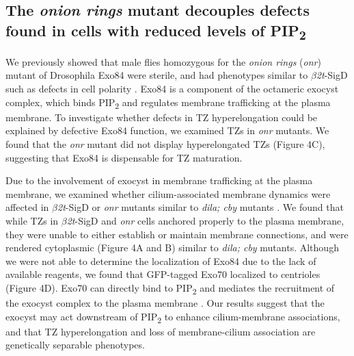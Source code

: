 \documentclass[12pt, twoside, letterpaper]{article}
\newcommand{\PIP}{PIP\textsubscript{2}}
\newcommand{\sigd}{$\beta$\textit{2t}-SigD}
\begin{document}
\begin{doublespacing}
\begin{linenumbers}
    \subsection{The \textit{onion rings} mutant decouples defects found in cells with reduced levels of \PIP{}}
    We previously showed that male flies homozygous for the \textit{onion rings}
    (\textit{onr}) mutant of Drosophila Exo84 were sterile, and had phenotypes
    similar to \sigd{} such as defects in cell polarity \citep{wei2008depletion}.
    Exo84 is a component of the octameric exocyst complex, which binds
    \PIP{} and regulates membrane trafficking at the plasma membrane.
    To investigate whether defects in TZ hyperelongation could be explained by
    defective Exo84 function, we examined TZs in \textit{onr} mutants.
    We found that the \textit{onr} mutant did not display hyperelongated TZs (Figure 4C),
    suggesting that Exo84 is dispensable for TZ maturation.

    Due to the involvement of exocyst in membrane trafficking at the plasma membrane,
    we examined whether cilium-associated membrane dynamics were affected in \sigd{}
    or \textit{onr} mutants similar to \textit{dila; cby} mutants
    \citep{vieillard2016transition}.
    We found that while TZs in \sigd{} and \textit{onr} cells anchored properly
    to the plasma membrane, they were unable to either establish or maintain
    membrane connections, and were rendered cytoplasmic (Figure 4A and B) similar to
    \textit{dila; cby} mutants.
    Although we were not able to determine the localization of Exo84 due to the
    lack of available reagents,
    we found that GFP-tagged Exo70 localized to centrioles (Figure 4D).
    Exo70 can directly bind to \PIP{} and mediates the recruitment of
    the exocyst complex to the plasma membrane \citep{he2007exo70}.
    Our results suggest that the exocyst may act downstream of \PIP{} to
    enhance cilium-membrane associations, and that TZ hyperelongation and loss of
    membrane-cilium association are genetically separable phenotypes.


\end{linenumbers}
\end{doublespacing}
\end{document}
